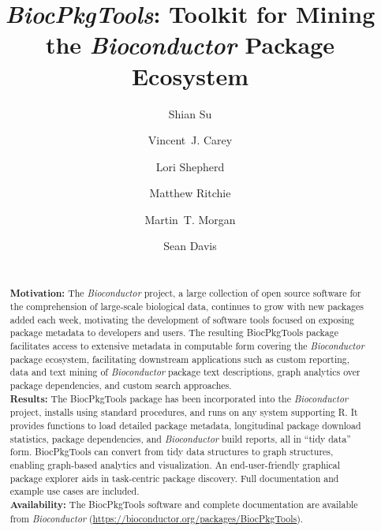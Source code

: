 \documentclass[9pt,a4paper]{extarticle}\usepackage[]{graphicx}\usepackage[]{color}
\begin{document}
\pagestyle{front}

\title{\textit{BiocPkgTools}: Toolkit for Mining the \emph{Bioconductor} Package Ecosystem}

\author[1]{Shian Su}
\author[2]{Vincent~J. Carey}
\author[3]{Lori Shepherd}
\author[1]{Matthew Ritchie}
\author[3]{Martin~T. Morgan}
\author[4]{Sean Davis}

\maketitle
\thispagestyle{front}


\begin{abstract}
  \\ \textbf{Motivation:} The \emph{Bioconductor} project, a large
  collection of open source software for the comprehension of
  large-scale biological data, continues to grow with new packages
  added each week, motivating the development of software tools
  focused on exposing package metadata to developers and users. The
  resulting BiocPkgTools package facilitates access to extensive
  metadata in computable form covering the \emph{Bioconductor} package
  ecosystem, facilitating downstream applications such as custom
  reporting, data and text mining of \emph{Bioconductor} package text
  descriptions, graph analytics over package
  dependencies, and custom search approaches. \\
  \textbf{Results:} The BiocPkgTools package has been incorporated
  into the \emph{Bioconductor} project, installs using standard
  procedures, and runs on any system supporting R. It provides
  functions to load detailed package metadata, longitudinal package
  download statistics, package dependencies, and \emph{Bioconductor}
  build reports, all in ``tidy data'' form. BiocPkgTools can convert
  from tidy data structures to graph structures, enabling graph-based
  analytics and visualization. An end-user-friendly graphical package
  explorer aids in task-centric package discovery. Full documentation
  and example use cases are included. \\ \textbf{Availability:} The
  BiocPkgTools software and complete documentation are available from
  \emph{Bioconductor}
  (\href{https://bioconductor.org/packages/BiocPkgTools}{https://bioconductor.org/packages/BiocPkgTools}).
\end{abstract}
\end{document}
